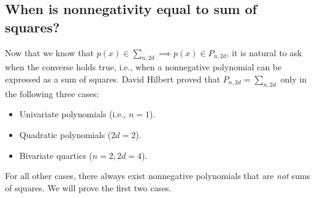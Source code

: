 	
			
			
			
			
			
	
	\subsection{When is nonnegativity equal to sum of squares?}
	
	Now that we know that $p(x) \in \sum_{n, 2d} \implies p(x) \in P_{n,2d}$, it is natural to ask when the converse holds true, i.e., when a nonnegative polynomial can be expressed as a sum of squares. David Hilbert proved that $P_{n,2d} = \sum_{n,2d}$ only in the following three cases:
	\begin{itemize}
		\item Univariate polynomials (i.e., $n = 1$).
		
		\item Quadratic polynomials ($2d = 2$).
		
		\item Bivariate quartics ($n = 2, 2d = 4$). 
	\end{itemize}
	For all other cases, there always exist nonnegative polynomials that are \emph{not} sums of squares. We will prove the first two cases. 
	
